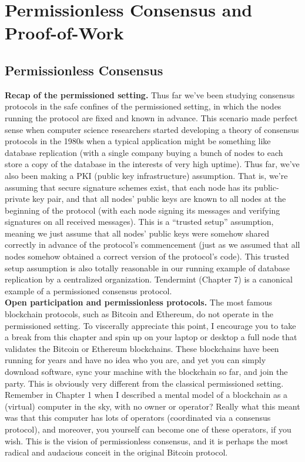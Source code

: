 \chapter{Permissionless Consensus and Proof-of-Work}
\section{Permissionless Consensus}
\noindent
\textbf{Recap of the permissioned setting.} Thus far we've been studying consensus protocols
in the safe confines of the permissioned setting, in which the nodes running the protocol
are fixed and known in advance. This scenario made perfect sense when computer science
researchers started developing a theory of consensus protocols in the 1980s when a typical
application might be something like database replication (with a single company buying a
bunch of nodes to each store a copy of the database in the interests of very high uptime).
Thus far, we’ve also been making a PKI (public key infrastructure) assumption. That
is, we’re assuming that secure signature schemes exist, that each node has its public-private key pair, and that all nodes’ public keys are known to all nodes at the beginning of
the protocol (with each node signing its messages and verifying signatures on all received
messages). This is a “trusted setup” assumption, meaning we just assume that all nodes’
public keys were somehow shared correctly in advance of the protocol’s commencement (just
as we assumed that all nodes somehow obtained a correct version of the protocol’s code).
This trusted setup assumption is also totally reasonable in our running example of database
replication by a centralized organization. Tendermint (Chapter 7) is a canonical example of a permissioned consensus protocol.\\

\noindent
\textbf{Open participation and permissionless protocols.} The most famous blockchain protocols, such as Bitcoin and Ethereum, do not operate in the permissioned setting. To viscerally appreciate this point, I encourage you to take a break from this chapter and spin up
on your laptop or desktop a full node that validates the Bitcoin or Ethereum blockchains.
These blockchains have been running for years and have no idea who you are, and yet you
can simply download software, sync your machine with the blockchain so far, and join the
party. This is obviously very different from the classical permissioned setting.
Remember in Chapter 1 when I described a mental model of a blockchain as a (virtual)
computer in the sky, with no owner or operator? Really what this meant was that this
computer has lots of operators (coordinated via a consensus protocol), and moreover, you
yourself can become one of these operators, if you wish. This is the vision of permissionless consensus, and it is perhaps the most radical and audacious conceit in the original Bitcoin protocol.\\

